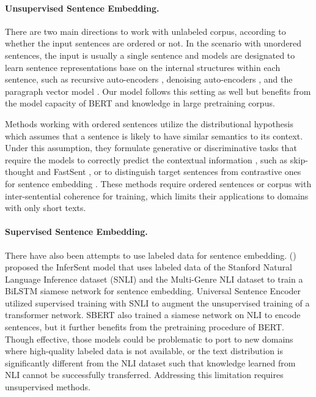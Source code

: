 \documentclass[11pt,a4paper]{article}
\begin{document}
\paragraph{Unsupervised Sentence Embedding.} There are two main directions to work with unlabeled corpus, according to whether the input sentences are ordered or not. In the scenario with unordered sentences, the input is usually a single sentence and models are designated to learn sentence representations base on the internal structures within each sentence,  such as recursive auto-encoders \cite{Socher2011}, denoising auto-encoders \cite{hill2016}, and the paragraph vector model \cite{Le2014}. Our model follows this setting as well but benefits from the model capacity of BERT and knowledge in large pretraining corpus. 

Methods working with ordered sentences utilize the distributional hypothesis which assumes that a sentence is likely to have similar semantics to its context. Under this assumption, they formulate generative or discriminative tasks that require the models to correctly predict the contextual information , such as skip-thought \cite{Kiros2015} and FastSent \cite{hill2016}, or to distinguish target sentences from contrastive ones \cite{Jernite17,logeswaran2018} for sentence embedding \cite{Jernite17,logeswaran2018}. These methods require ordered sentences or corpus with inter-sentential coherence for training, which limits their applications to domains with only short texts. 





\paragraph{Supervised Sentence Embedding.} There have also been attempts to use labeled data for sentence embedding. \citeauthor{conneau2017} (\citeyear{conneau2017}) proposed the InferSent model that uses labeled data of the Stanford Natural Language Inference dataset (SNLI) \cite{bowman2015} and the Multi-Genre NLI dataset \cite{williams2018} to train a BiLSTM siamese network for sentence embedding. Universal Sentence Encoder \cite{cer2018} utilized supervised training with SNLI to augment the unsupervised training of a transformer network. SBERT \cite{reimers2019} also trained a siamese network on NLI to encode sentences, but it further benefits from the pretraining procedure of BERT. Though effective, those models could be problematic to port to new domains where high-quality labeled data is not available, or the text distribution is significantly different from the NLI dataset such that knowledge learned from NLI cannot be successfully transferred. Addressing this limitation requires unsupervised methods. 
\end{document}
